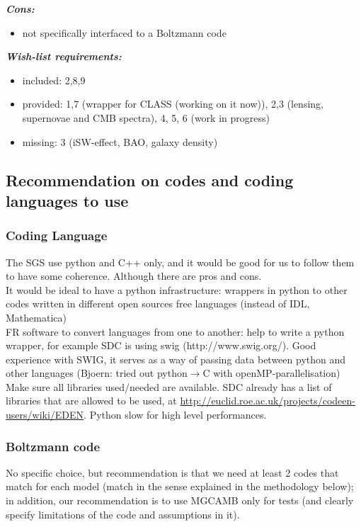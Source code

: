 {\it \bf Cons:} 
\begin{itemize}
 \item not specifically interfaced to a Boltzmann code
\end{itemize}

{\it \bf Wish-list requirements: }
\begin{itemize}
\item{included: 2,8,9}
\item{provided: 1,7 (wrapper for CLASS (working on it now)), 2,3 (lensing, supernovae and CMB spectra), 4, 5, 6 (work in progress)}
\item{missing: 3 (iSW-effect, BAO, galaxy density)}
\end{itemize}

\newpage
\subsection{Recommendation on codes and coding languages to use}

\subsubsection{Coding Language}
The SGS use python and C++ only, and it would be good for us to follow them to have some coherence. Although there are pros and cons.\\
It would be ideal to have a python infrastructure: wrappers in python to other codes written in different open sources free languages (instead of IDL, Mathematica)\\
FR software to convert languages from one to another: help to write a python wrapper, for example SDC is using swig (http://www.swig.org/).
Good experience with SWIG, it serves as a way of passing data between python and other languages (Bjoern: tried out python$\rightarrow$C with openMP-parallelisation)\\
Make sure all libraries used/needed are available. 
SDC already has a list of libraries that are allowed to be used, at \url{http://euclid.roe.ac.uk/projects/codeen-users/wiki/EDEN}.
Python slow for high level performances. 

\subsubsection{Boltzmann code}

No specific choice, but recommendation is that we need at least 2 codes that match for each model (match in the sense explained in the methodology below); 
in addition, our recommendation is to use MGCAMB only for tests (and clearly specify limitations of the code and assumptions in it).


